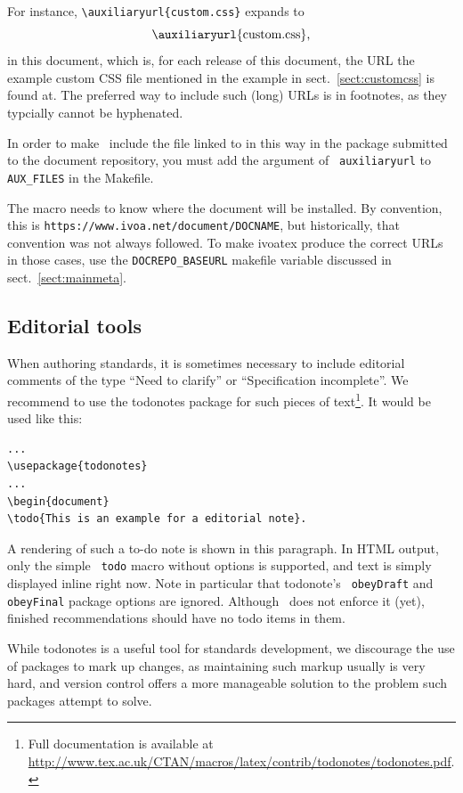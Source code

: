 \documentclass[11pt,a4paper]{ivoa}
\newcommand{\texword}[1]{\texttt{\color{texcolor} #1}}
\begin{document}
For instance, \verb|\auxiliaryurl{custom.css}| expands to
$$\hbox{\auxiliaryurl{custom.css},}$$ in this document,
which is, for each release of this
document, the URL the example custom CSS file mentioned in the example
in sect.~\ref{sect:customcss} is found at.  The preferred way to include
such (long) URLs is in footnotes, as they typcially cannot be hyphenated.

In order to make \ivoatex~include the file linked to in this way in the
package submitted to the document repository, you must add the argument
of \texword{auxiliaryurl} to \verb|AUX_FILES| in the Makefile.

The macro needs to know where the document will be installed.  By
convention, this is \nolinkurl{https://www.ivoa.net/document/DOCNAME},
but historically, that convention was not always followed.  To make
ivoatex produce the correct URLs in those cases, use the
\verb|DOCREPO_BASEURL| makefile variable discussed in
sect.~\ref{sect:mainmeta}.

\subsection{Editorial tools}

When authoring standards, it is sometimes necessary to include
editorial comments of the type ``Need to clarify'' or ``Specification
incomplete''.  We recommend to use the todonotes package for such
pieces of text\footnote{Full documentation is available at
\url{http://www.tex.ac.uk/CTAN/macros/latex/contrib/todonotes/todonotes.pdf}.}.
It would be used like this:
\begin{lstlisting}
...
\usepackage{todonotes}
...
\begin{document}
\todo{This is an example for a editorial note}.
\end{lstlisting}

A rendering of such a to-do note is shown in this
paragraph. In HTML output,
only the simple \texword{todo} macro without options is supported, and
text is simply displayed inline right now.  Note in particular that
todonote's \texword{obeyDraft} and \texword{obeyFinal} package options
are ignored.  Although \ivoatex\ does not enforce it (yet), finished
recommendations should have no todo items in them.

While todonotes is a useful tool for standards development, we
discourage the use of packages to mark up changes, as maintaining such
markup usually is very hard, and version control offers a more
manageable solution to the problem such packages attempt to solve.
\end{document}
